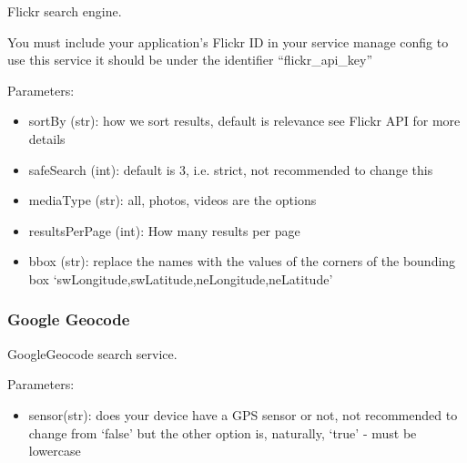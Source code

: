 \documentclass[letterpaper,10pt,english]{sphinxmanual}
\begin{document}
\begin{fulllineitems}
\label{api2.0:puppy.search.engine.Flickr}
Flickr search engine.

You must include your application's Flickr ID in your service manage config to use this service
it should be under the identifier ``flickr\_api\_key''

Parameters:
\begin{itemize}
\item {} 
sortBy (str):  how we sort results, default is relevance see Flickr API for more details

\item {} 
safeSearch (int): default is 3, i.e. strict, not recommended to change this

\item {} 
mediaType (str): all, photos, videos are the options

\item {} 
resultsPerPage (int): How many results per page

\item {} 
bbox (str): replace the names with the values of the corners of the bounding box `swLongitude,swLatitude,neLongitude,neLatitude'

\end{itemize}

\end{fulllineitems}



\subsubsection{Google Geocode}
\label{api2.0:google-geocode}

\begin{fulllineitems}
\label{api2.0:puppy.search.engine.GoogleGeocode}
GoogleGeocode search service.

Parameters:
\begin{itemize}
\item {} 
sensor(str): does your device have a GPS sensor or not, not recommended to change from `false' but the other option is, naturally, `true' - must be lowercase

\end{itemize}

\end{fulllineitems}
\end{document}
